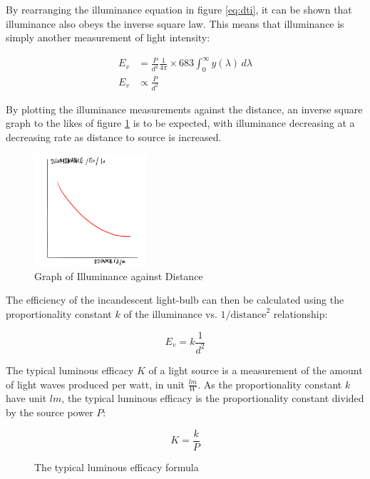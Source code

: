 \documentclass[a4paper,12pt]{article}
\begin{document}
By rearranging the illuminance equation in figure \ref{eq:dti}, it can be shown that illuminance also obeys the inverse square law. This means that illuminance is simply another measurement of light intensity:

\begin{align*}
 E_v &=  \frac{P}{d^2} \frac{1}{4\pi} \times 683 \int_{0}^{\infty} y(\lambda) \, d\lambda\\
 E_v &\propto \frac{P}{d^2}
\end{align*}

By plotting the illuminance measurements against the distance, an inverse square graph to the likes of figure \ref{fig:relation} is to be expected, with illuminance decreasing at a decreasing rate as distance to source is increased.

\begin{figure}[H]
    \centering
    \includegraphics[width=0.37\textwidth]{assets/relationship.png}
    \caption{Graph of Illuminance against Distance}
    \label{fig:relation}
\end{figure}

The efficiency of the incandescent light-bulb can then be calculated using the proportionality constant $k$ of the illuminance vs. $1/\text{distance}^2$ relationship:

\[
E_v = k \frac{1}{d^2}
\]

The typical luminous efficacy $K$ of a light source is a measurement of the amount of light waves produced per watt, in unit $\frac{\si{lm}}{W}$. As the proportionality constant $k$ have unit $\si{lm}$, the typical luminous efficacy is the proportionality constant divided by the source power $P$:

\begin{figure}[H]
    \[
    K = \frac{k}{P}
    \]
    \caption{The typical luminous efficacy formula}
    \label{fig:tle}
\end{figure}


\end{document}
